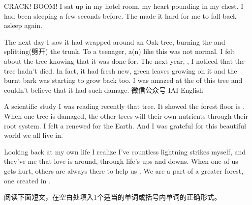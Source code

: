 \documentclass{英语试卷}
\begin{document}
\par CRACK! BOOM! I sat up in my hotel room, my heart pounding in my chest. I had been sleeping a few seconds before. The  made it hard for me to fall back asleep again.\par
\par The next day I saw it had wrapped around an Oak tree, burning the  and splitting(劈开) the trunk. To a teenager, a(n)  like this was not normal. I felt  about the tree knowing that it was done for. The next year, , I noticed that the tree hadn't died. In fact, it had fresh new, green leaves growing on it and the burnt bark was starting to grow back too. I was amazed at the  of this tree and couldn't believe that it had  such damage. 微信公众号 IAI English\par
\par A scientific study I was reading recently  that tree. It showed the forest floor is . When one tree is damaged, the other trees will  their own nutrients through their root system. I felt a renewed  for the Earth. And I was grateful for this beautiful world we all live in.\par
\par Looking back at my own life I realize I've  countless lightning strikes myself, and they've  me that love is around, through life's ups and downs. When one of us gets hurt, others are always there to help us . We are a part of a greater forest, one created in .\par
{}
\par 阅读下面短文，在空白处填入1个适当的单词或括号内单词的正确形式。\par
\end{document}

